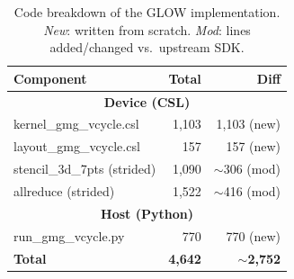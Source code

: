 \documentclass[conference]{IEEEtran}
\begin{document}

            

            \begin{table}[t]
                \caption{Code breakdown of the GLOW implementation. \textit{New}: written from scratch. \textit{Mod}: lines added/changed vs.\ upstream SDK.}
                \label{tab:code_breakdown}
                \centering
                \footnotesize
                \setlength{\tabcolsep}{3pt}
                \begin{tabular}{|l||r|r|} \hline
                    \textbf{Component}               & \textbf{Total} & \textbf{Diff} \\ \hline \hline
                    \multicolumn{3}{|c|}{\textbf{Device (CSL)}} \\ \hline \hline
                    \quad kernel\_gmg\_vcycle.csl    & 1,103          & 1,103 (new)   \\ \hline
                    \quad layout\_gmg\_vcycle.csl    & 157            & 157 (new)     \\ \hline
                    \quad stencil\_3d\_7pts (strided)   & 1,090          & ${\sim}$306 (mod) \\ \hline
                    \quad allreduce (strided)           & 1,522          & ${\sim}$416 (mod) \\ \hline \hline
                    \multicolumn{3}{|c|}{\textbf{Host (Python)}} \\ \hline \hline
                    \quad run\_gmg\_vcycle.py        & 770            & 770 (new)     \\ \hline \hline
                    \textbf{Total}                   & \textbf{4,642} & \textbf{${\sim}$2,752} \\ \hline
                \end{tabular}
            \end{table}
\end{document}
